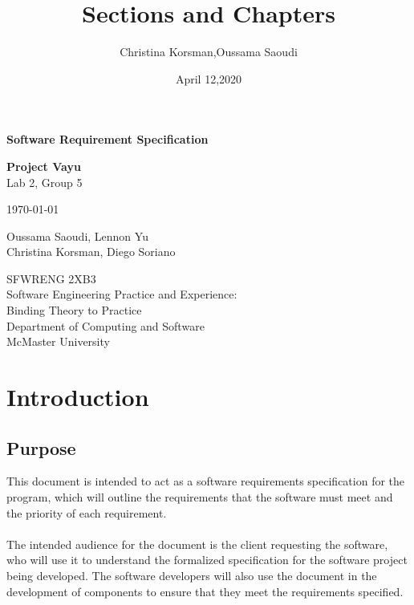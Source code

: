 \documentclass{article}
\title{Sections and Chapters}
\author{Christina Korsman,Oussama Saoudi}
\date{April 12,2020}
\begin{document}
\begin{titlepage}
    \begin{center}
        \vspace*{1cm}

        \Huge
        \textbf{Software Requirement Specification}

        \LARGE
        \vspace{0.5cm}
        \textbf{Project Vayu}\\
        \vspace{0.2cm}
        Lab 2, Group 5

        \vspace{0.2cm}
        \today

        \vspace{1.5cm}

        \Large
        Oussama Saoudi, Lennon Yu\\
        Christina Korsman, Diego Soriano

        \vfill

        \vspace{0.8cm}

        \large
        SFWRENG 2XB3\\
        Software Engineering Practice and Experience:\\
        Binding Theory to Practice\\
        Department of Computing and Software\\
        McMaster University
    \end{center}
\end{titlepage}

\tableofcontents
\pagebreak

\section{Introduction}
\subsection{Purpose}
This document is intended to act as a software requirements specification
for the program, which will outline the requirements that the software
must meet and the priority of each requirement. \\\\
The intended audience for the document is the client requesting the software,
who will use it to understand the formalized specification for the software
project being developed. The software developers will also use the document
in the development of components to ensure that they meet the requirements specified.
\end{document}
